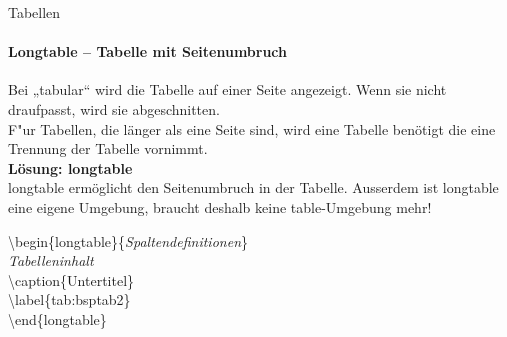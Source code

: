 \begin{frame}{Tabellen}
\framesubtitle{Longtable -- Tabelle mit Seitenumbruch}
\bigskip
Bei „tabular“ wird die Tabelle auf einer Seite angezeigt. Wenn sie nicht draufpasst, wird sie abgeschnitten.\\
F"ur Tabellen, die länger als eine Seite sind, wird eine Tabelle benötigt die eine Trennung der Tabelle vornimmt.\\
\textbf{Lösung: {\ttfamily longtable}}\\
{\ttfamily longtable} ermöglicht den Seitenumbruch in der Tabelle. Ausserdem ist {\ttfamily longtable} eine eigene Umgebung, braucht deshalb keine {\ttfamily table}-Umgebung mehr!\\[3mm]

\begin{ttfamily}
\color{unibablueI}\textbackslash begin\color{black}\{longtable\}\{\textit{Spaltendefinitionen}\}\\
\textit{Tabelleninhalt}\\
\color{nounibaredI}\textbackslash caption\color{black}\{Untertitel\}\\
\color{nounibaredI}\textbackslash label\color{black}\{tab:bsptab2\}\\
\color{unibablueI}\textbackslash end\color{black}\{longtable\}
\end{ttfamily}
\end{frame}



